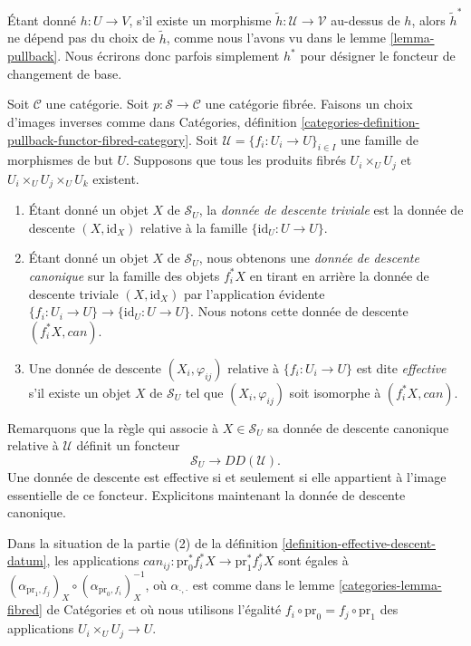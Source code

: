 \noindent
Étant donné $h : U \to V$, s'il existe un morphisme
$\tilde h : \mathcal{U} \to \mathcal{V}$ au-dessus de $h$,
alors $\tilde h^*$ ne dépend pas du choix de $\tilde h$, comme nous l'avons vu
dans le lemme \ref{lemma-pullback}. Nous écrirons donc parfois simplement
$h^*$ pour désigner le foncteur de changement de base.

\begin{definition}
\label{definition-effective-descent-datum}
Soit $\mathcal{C}$ une catégorie.
Soit $p : \mathcal{S} \to \mathcal{C}$ une catégorie fibrée.
Faisons un choix d'images inverses comme dans Catégories,
définition \ref{categories-definition-pullback-functor-fibred-category}.
Soit $\mathcal{U} = \{f_i : U_i \to U\}_{i \in I}$ une famille de morphismes
de but $U$. Supposons que tous les produits fibrés
$U_i \times_U U_j$ et $U_i \times_U U_j \times_U U_k$ existent.
\begin{enumerate}
\item Étant donné un objet $X$ de $\mathcal{S}_U$, la {\it donnée de descente
triviale} est la donnée de descente $(X, \text{id}_X)$ relative à la famille
$\{\text{id}_U : U \to U\}$.
\item Étant donné un objet $X$ de $\mathcal{S}_U$, nous obtenons une
{\it donnée de descente canonique} sur la famille des objets $f_i^*X$ en
tirant en arrière la donnée de descente triviale $(X, \text{id}_X)$ par
l'application évidente
$\{f_i : U_i \to U\} \to \{\text{id}_U : U \to U\}$.
Nous notons cette donnée de descente $(f_i^*X, can)$.
\item Une donnée de descente $(X_i, \varphi_{ij})$
relative à $\{f_i : U_i \to U\}$ est dite {\it effective}
s'il existe un objet $X$ de $\mathcal{S}_U$ tel que
$(X_i, \varphi_{ij})$ soit isomorphe à $(f_i^*X, can)$.
\end{enumerate}
\end{definition}

\noindent
Remarquons que la règle qui associe à $X \in \mathcal{S}_U$ sa donnée de
descente canonique relative à $\mathcal{U}$ définit un foncteur
$$
\mathcal{S}_U \longrightarrow DD(\mathcal{U}).
$$
Une donnée de descente est effective si et seulement si elle appartient à
l'image essentielle de ce foncteur. Explicitons maintenant la donnée de
descente canonique.

\begin{lemma}
\label{lemma-trivial-cocycle}
Dans la situation de la partie (2) de la
définition \ref{definition-effective-descent-datum}, les applications
$can_{ij} : \text{pr}_0^*f_i^*X \to \text{pr}_1^*f_j^*X$ sont égales à
$(\alpha_{\text{pr}_1, f_j})_X \circ (\alpha_{\text{pr}_0, f_i})_X^{-1}$,
où $\alpha_{\cdot, \cdot}$ est comme dans le
lemme \ref{categories-lemma-fibred} de Catégories et où nous utilisons
l'égalité $f_i \circ \text{pr}_0 = f_j \circ \text{pr}_1$
des applications $U_i \times_U U_j \to U$.
\end{lemma}

